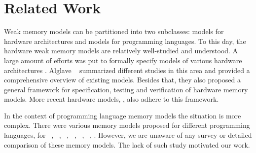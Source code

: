 \section{Related Work}
\label{sec:related}

Weak memory models can be partitioned into two subclasses: 
models for hardware architectures and models for programming languages. 
To this day, the hardware weak memory models are relatively well-studied and understood.
A large amount of efforts was put to formally specify models of various 
hardware architectures%
\cite{Chong-ASPLOS08, Alglave-DAMP09, Sewell-al:CACM10, Sarkar-al:PLDI11}.
Alglave \etal~\cite{Alglave-al:TOPLAS14} summarized different studies in this area 
and provided a comprehensive overview of existing models.  
Besides that, they also proposed a general framework for specification, 
testing and verification of hardware memory models.
More recent hardware models, \eg \cite{Pulte-al:POPL18}, 
also adhere to this framework.   

In the context of programming language memory models the situation is more complex. 
There were various memory models proposed for different programming languages, \eg
for \Java~\cite{Manson-al:POPL05, Bender-Palsberg:OOPSLA19}, \CPP~\cite{Batty-al:POPL11}, 
\LLVM~\cite{Chakraborty-Vafeiadis:CGO17}, \JS~\cite{Watt-al:PLDI2020}, 
\OCaml~\cite{Manson-al:POPL05}, \Haskell~\cite{Vollmer-al:PPoPP17}, \etc. 
However, we are unaware of any survey or detailed comparison of these memory models.
The lack of such study motivated our work.

